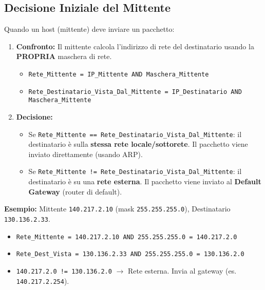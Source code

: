 \subsection{Decisione Iniziale del Mittente}
Quando un host (mittente) deve inviare un pacchetto:
\begin{enumerate}
    \item \textbf{Confronto:} Il mittente calcola l'indirizzo di rete del destinatario usando la \textbf{PROPRIA} maschera di rete.
    \begin{itemize}
        \item \texttt{Rete\_Mittente = IP\_Mittente AND Maschera\_Mittente}
        \item \texttt{Rete\_Destinatario\_Vista\_Dal\_Mittente = IP\_Destinatario AND Maschera\_Mittente}
    \end{itemize}
    \item \textbf{Decisione:}
    \begin{itemize}
        \item Se \texttt{Rete\_Mittente == Rete\_Destinatario\_Vista\_Dal\_Mittente}: il destinatario è sulla \textbf{stessa rete locale/sottorete}. Il pacchetto viene inviato direttamente (usando ARP).
        \item Se \texttt{Rete\_Mittente != Rete\_Destinatario\_Vista\_Dal\_Mittente}: il destinatario è su una \textbf{rete esterna}. Il pacchetto viene inviato al \textbf{Default Gateway} (router di default).
    \end{itemize}
\end{enumerate}
\textbf{Esempio:} Mittente \texttt{140.217.2.10} (mask \texttt{255.255.255.0}), Destinatario \texttt{130.136.2.33}.
\begin{itemize}
    \item \texttt{Rete\_Mittente = 140.217.2.10 AND 255.255.255.0 = 140.217.2.0}
    \item \texttt{Rete\_Dest\_Vista = 130.136.2.33 AND 255.255.255.0 = 130.136.2.0}
    \item \texttt{140.217.2.0 != 130.136.2.0} $\rightarrow$ Rete esterna. Invia al gateway (es. \texttt{140.217.2.254}).
\end{itemize}

